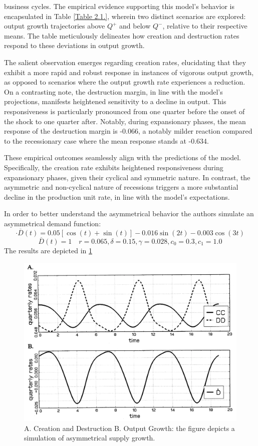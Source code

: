 \documentclass[12pt]{report}
\begin{document}
business cycles. The empirical evidence supporting this model's behavior is encapsulated in Table \ref{Table 2.1.},
wherein two distinct scenarios are explored: output growth trajectories above \(Q^+\) and below \(Q^-\), relative to
their respective means. The table meticulously delineates how creation and destruction rates respond to these deviations
in output growth. 
\par
The salient observation emerges regarding creation rates, elucidating that they exhibit a more rapid and robust response
in instances of vigorous output growth, as opposed to scenarios where the output growth rate experiences a reduction. On
a contrasting note, the destruction margin, in line with the model's projections, manifests heightened sensitivity to a
decline in output. This responsiveness is particularly pronounced from one quarter before the onset of the shock to one
quarter after. Notably, during expansionary phases, the mean response of the destruction margin is -0.066, a notably
milder reaction compared to the recessionary case where the mean response stands at -0.634. 
\par
These empirical outcomes seamlessly align with the predictions of the model. Specifically, the creation rate exhibits
heightened responsiveness during expansionary phases, given their cyclical and symmetric nature. In contrast, the
asymmetric and non-cyclical nature of recessions triggers a more substantial decline in the production unit rate, in
line with the model's expectations. 
\par 
In order to better understand the asymmetrical behavior the authors simulate an asymmetrical demand function:
\[\cdot{\overline{D}}(t)=0.05[\cos(t)+\sin(t)] - 0.016 \sin(2t)-0.003\cos(3t)\]
\[\overline{D}(t)=1\quad r = 0.065, \delta =0.15, \gamma=0.028, c_0=0.3, c_1=1.0\] 
The results are depicted in \ref{plot:2.4}
\begin{figure}
    \centering
    \includegraphics[scale = 0.4]{figure/Plot2.4.png}
    \caption{A.  Creation and  Destruction B. Output Growth: the figure depicts a simulation of asymmetrical supply growth.}
    \label{plot:2.4}
\end{figure}
\end{document}
